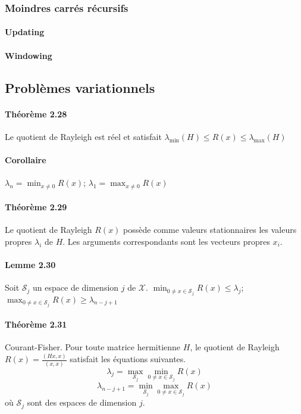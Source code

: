 \subsubsection{Moindres carrés récursifs}
\paragraph{Updating}
\paragraph{Windowing}

\subsection{Problèmes variationnels}

\paragraph{Théorème 2.28} Le quotient de Rayleigh est réel et satisfait $\lambda_{\text{min}} (H) \leq R(x) \leq \lambda_{\text{max}} (H)$

\paragraph{Corollaire} $\lambda_n = \min_{x\neq 0} R(x)$; $\lambda_1 = \max_{x\neq 0} R(x)$

\paragraph{Théorème 2.29} Le quotient de Rayleigh $R(x)$ possède comme valeurs stationnaires les valeurs propres $\lambda_i$ de $H$. Les arguments correspondants sont les vecteurs propres $x_i$.

\paragraph{Lemme 2.30} Soit $\mathcal{S}_j$ un espace de dimension $j$ de $\mathcal{X}$. $\min_{0\neq x \in \mathcal{S}_j} R(x) \leq \lambda_j$; $\max_{0\neq x \in \mathcal{S}_j} R(x) \geq \lambda_{n-j+1}$

\paragraph{Théorème 2.31} Courant-Fisher. Pour toute matrice hermitienne $H$, le quotient de Rayleigh $R(x) = \frac{(Hx,x)}{(x,x)}$ satisfait les équations suivantes.
$$\lambda_j = \max_{\mathcal{S}_j} \min_{0\neq x \in \mathcal{S}_j} R(x)$$
$$\lambda_{n-j+1} = \min_{\mathcal{S}_j} \max_{0\neq x \in \mathcal{S}_j} R(x)$$ où $\mathcal{S}_j$ sont des espaces de dimension $j$.

